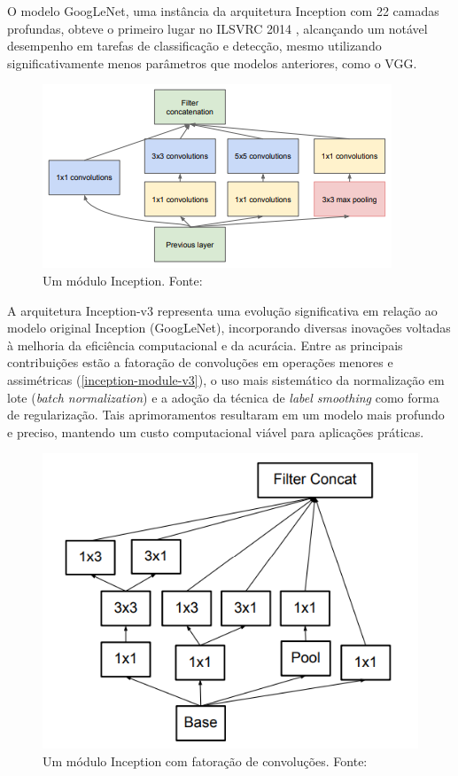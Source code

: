 O modelo GoogLeNet, uma instância da arquitetura Inception com 22 camadas profundas, obteve o primeiro lugar no ILSVRC 2014 \citep{Russakovsky2015}, alcançando um notável desempenho em tarefas de classificação e detecção, mesmo utilizando significativamente menos parâmetros que modelos anteriores, como o VGG.

\begin{figure}[h]
    \centering
    \includegraphics[width=0.5\linewidth]{figs/inception-module.png}
    \caption{Um módulo Inception. Fonte: \cite{Szegedy2015}}
    \label{inception-module}
\end{figure}

A arquitetura Inception-v3 \citep{Szegedy2016} representa uma evolução significativa em relação ao modelo original Inception (GoogLeNet), incorporando diversas inovações voltadas à melhoria da eficiência computacional e da acurácia. Entre as principais contribuições estão a fatoração de convoluções em operações menores e assimétricas (\autoref{inception-module-v3}), o uso mais sistemático da normalização em lote (\textit{batch normalization}) e a adoção da técnica de \textit{label smoothing} como forma de regularização. Tais aprimoramentos resultaram em um modelo mais profundo e preciso, mantendo um custo computacional viável para aplicações práticas.

\begin{figure}[h]
    \centering
    \includegraphics[width=0.5\linewidth]{figs/inception-module-v3.png}
    \caption{Um módulo Inception com fatoração de convoluções. Fonte: \cite{Szegedy2015}}
    \label{inception-module-v3}
\end{figure}

